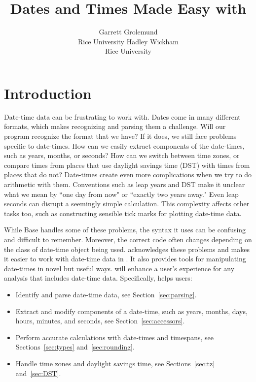 \documentclass[article]{jss}
\author{Garrett Grolemund\\Rice University \And 
        Hadley Wickham\\Rice University}
\title{Dates and Times Made Easy with \pkg{lubridate}}
\begin{document}
\section{Introduction}

Date-time data can be frustrating to work with. Dates come in many different formats, which makes recognizing and parsing them a challenge. Will our program recognize the format that we have? If it does, we still face problems specific to date-times. How can we easily extract components of the date-times, such as years, months, or seconds? How can we switch between time zones, or compare times from places that use daylight savings time (DST) with times from places that do not? Date-times create even more complications when we try to do arithmetic with them. Conventions such as leap years and DST make it unclear what we mean by ``one day from now" or ``exactly two years away."  Even leap seconds can disrupt a seemingly simple calculation.  This complexity affects other tasks too, such as constructing sensible tick marks for plotting date-time data.

While Base  \citep{R} handles some of these problems, the syntax it uses can be confusing and difficult to remember. Moreover, the correct  code often changes depending on the class of date-time object being used.  acknowledges these problems and makes it easier to work with date-time data in . It also provides tools for manipulating date-times in novel but useful ways.  will enhance a user's experience for any analysis that includes date-time data. Specifically,  helps users:

\begin{itemize}
   \item Identify and parse date-time data, see Section~\ref{sec:parsing}.
   
    \item Extract and modify components of a date-time, such as years, months, days, hours, minutes, and seconds, see Section~\ref{sec:accessors}.
  
  \item Perform accurate calculations with date-times and timespans, see Sections~\ref{sec:types} and~\ref{sec:rounding}.
    
  \item Handle time zones and daylight savings time, see Sections~\ref{sec:tz} and~\ref{sec:DST}.
  
\end{itemize}
\end{document}
